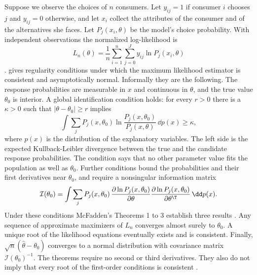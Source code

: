 Suppose we observe the choices of $n$ consumers. Let $y_{ij} = 1$ if consumer $i$ chooses $j$ and
$y_{ij} = 0$ otherwise, and let $x_i$ collect the attributes of the consumer and of the alternatives she faces.
Let
$P_j(x_i, \theta)$ be the model's choice probability. With independent observations the normalized
log-likelihood is
\begin{equation}\label{eq:06-ll}
L_n(\theta) = \frac{1}{n}\sum_{i=1}^n \sum_{j=0}^J y_{ij}\ln P_j(x_i, \theta)
\end{equation}
\citep[eqs.~3.5--3.6, p.~1407]{McFadden1984}. \citet[sec.~3.2]{McFadden1984} gives regularity conditions under
which the maximum likelihood estimator is consistent and asymptotically normal. Informally they are the
following. The response probabilities are measurable in $x$ and continuous in $\theta$, and the true value
$\theta_0$ is interior. A global identification condition holds: for every $r > 0$ there is a $\kappa > 0$
such that $|\theta - \theta_0| \ge r$ implies
\begin{equation}\label{eq:06-ident}
\int \sum_{j} P_j(x, \theta_0)\ln\frac{P_j(x, \theta_0)}{P_j(x, \theta)}\,\dd p(x) \ge \kappa ,
\end{equation}
where $p(x)$ is the distribution of the explanatory variables. The left side is the expected Kullback-Leibler
divergence between the true and the candidate response probabilities. The condition says that no other
parameter value fits the population as well as $\theta_0$. Further conditions bound the probabilities and their
first derivatives near $\theta_0$, and require a nonsingular information matrix
\begin{equation*}
\mathcal{I}(\theta_0) = \int \sum_j P_j(x, \theta_0)\,
\frac{\partial \ln P_j(x, \theta_0)}{\partial \theta}\frac{\partial \ln P_j(x, \theta_0)}{\partial \theta^\T}\,\dd p(x).
\end{equation*}
Under these conditions McFadden's Theorems 1 to 3 establish three results \citep[p.~1408]{McFadden1984}. Any
sequence of approximate maximizers of $L_n$ converges almost surely to $\theta_0$. A unique root of the
likelihood equations eventually exists and is consistent. Finally,
$\sqrt{n}(\hat\theta - \theta_0)$ converges to a normal distribution with covariance matrix
$\mathcal{I}(\theta_0)^{-1}$. The theorems require no second or third derivatives. They also do not imply
that every root of the first-order conditions is consistent \citep[p.~1409]{McFadden1984}.

